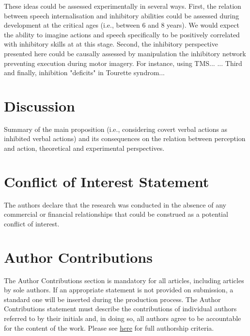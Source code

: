 \documentclass[utf8]{template/frontiersSCNS} %
\begin{document}
These ideas could be assessed experimentally in several ways. First, the relation between speech internalisation and inhibitory abilities could be assessed during development at the critical ages (i.e., between 6 and 8 years). We would expect the ability to imagine actions and speech specifically to be positively correlated with inhibitory skills at at this stage. Second, the inhibitory perspective presented here could be causally assessed by manipulation the inhibitory network preventing execution during motor imagery. For instance, using TMS... \citep{angelini_motor_2015, angelini_proactive_2016}... Third and finally, inhibition "deficits" in Tourette syndrom...

\section{Discussion}

Summary of the main proposition (i.e., considering covert verbal actions as inhibited verbal actions) and its consequences on the relation between perception and action, theoretical and experimental perspectives.

\section*{Conflict of Interest Statement}


The authors declare that the research was conducted in the absence of any commercial or financial relationships that could be construed as a potential conflict of interest.

\section*{Author Contributions}

The Author Contributions section is mandatory for all articles, including articles by sole authors. If an appropriate statement is not provided on submission, a standard one will be inserted during the production process. The Author Contributions statement must describe the contributions of individual authors referred to by their initials and, in doing so, all authors agree to be accountable for the content of the work. Please see  \href{http://home.frontiersin.org/about/author-guidelines#AuthorandContributors}{here} for full authorship criteria.
\end{document}
